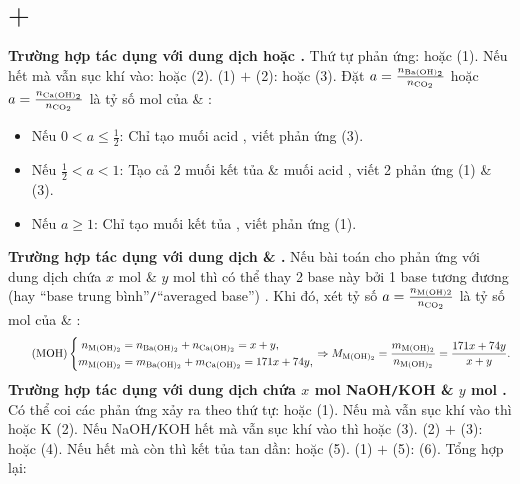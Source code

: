 \documentclass{article}
\begin{document}
\section{ $+$ }
\textbf{\textsf{Trường hợp  tác dụng với dung dịch  hoặc .}} Thứ tự phản ứng:  hoặc  (1). Nếu  hết mà vẫn sục khí  vào:  hoặc  (2). (1) $+$ (2):  hoặc  (3). Đặt $a = \frac{n_{\ce{Ba(OH)2}}}{n_{\ce{CO2}}}$ hoặc $a = \frac{n_{\ce{Ca(OH)2}}}{n_{\ce{CO2}}}$ là tỷ số mol của  \& :
\begin{itemize}
	\item Nếu $0 < a\le\frac{1}{2}$: Chỉ tạo muối acid , viết phản ứng (3).
	\item Nếu $\frac{1}{2} < a < 1$: Tạo cả 2 muối kết tủa  \& muối acid , viết 2 phản ứng (1) \& (3).
	\item Nếu $a\ge1$: Chỉ tạo muối kết tủa , viết phản ứng (1).
\end{itemize}
\textbf{\textsf{Trường hợp  tác dụng với dung dịch  \& .}} Nếu bài toán cho  phản ứng với dung dịch chứa $x$ mol  \& $y$ mol  thì có thể thay 2 base này bởi 1 base tương đương (hay ``base trung bình''{\tt/}``averaged base'') . Khi đó, xét tỷ số $a = \frac{n_{\rm M(OH)2}}{n_{\ce{CO2}}}$ là tỷ số mol của  \& :
\begin{equation}
	\label{M(OH)2}
	\tag{MOH}
	\left\{\begin{split}
		n_{\ce{M(OH)2}} &= n_{\ce{Ba(OH)2}} + n_{\ce{Ca(OH)2}} = x + y,\\
		m_{\ce{M(OH)2}} &= m_{\ce{Ba(OH)2}} + m_{\ce{Ca(OH)2}} = 171x + 74y,
	\end{split}\right.\Rightarrow M_{\ce{M(OH)2}} = \frac{m_{\ce{M(OH)2}}}{n_{\ce{M(OH)2}}} = \frac{171x + 74y}{x + y}.
\end{equation}
\noindent\textbf{\textsf{Trường hợp  tác dụng với dung dịch chứa $x$ mol {\rm NaOH}{\tt/}KOH \& $y$ mol .}} Có thể coi các phản ứng xảy ra theo thứ tự:  hoặc  (1). Nếu  mà vẫn sục khí  vào thì  hoặc K (2). Nếu NaOH{\tt/}KOH hết mà vẫn sục khí  vào thì  hoặc  (3). (2) $+$ (3):  hoặc  (4). Nếu  hết mà  còn thì kết tủa tan dần:  hoặc  (5). (1) $+$ (5):  (6). Tổng hợp lại:
\end{document}
